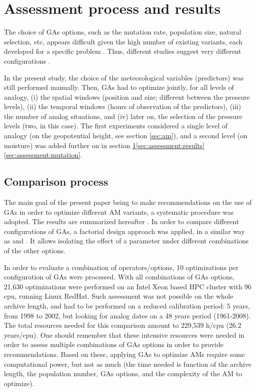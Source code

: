 \documentclass{ametsoc}
\begin{document}
\section{Assessment process and results}
\label{sec:assessment}

The choice of GAs options, such as the mutation rate, population size, natural selection, etc, appears difficult given the high number of existing variants, each developed for a specific problem \citep{Haupt2004, Costa2007a}. Thus, different studies suggest very different configurations \citep{DeJong1975a, Grefenstette1986, Back1996a, Back1996b}.

In the present study, the choice of the meteorological variables (predictors) was still performed manually. Then, GAs had to optimize jointly, for all levels of analogy, (i) the spatial windows (position and size; different between the pressure levels), (ii) the temporal windows (hours of observation of the predictors), (iii) the number of analog situations, and (iv) later on, the selection of the pressure levels (two, in this case). The first experiments considered a single level of analogy (on the geopotential height, see section \ref{sec:am}), and a second level (on moisture) was added further on in section \ref{sec:assessment}\ref{sec:assessment:results}\ref{sec:assessment:mutation}.


\subsection{Comparison process}

The main goal of the present paper being to make recommendations on the use of GAs in order to optimize different AM variants, a systematic procedure was adopted. The results are summarized hereafter \citep[see][for the details]{Horton2012a}. In order to compare different configurations of GAs, a factorial design approach was applied, in a similar way as \citet{Costa2005a,Costa2007a} and \citet{Mariano2010a}. It allows isolating the effect of a parameter under different combinations of the other options.

In order to evaluate a combination of operators/options, 10 optimizations per configuration of GAs were processed. With all combinations of GAs options, 21,630 optimizations were performed on an Intel Xeon based HPC cluster with 96 cpu, running Linux RedHat. Such assessment was not possible on the whole archive length, and had to be performed on a reduced calibration period: 5 years, from 1998 to 2002, but looking for analog dates on a 48 years period (1961-2008). The total resources needed for this comparison amount to 229,539 h/cpu (26.2 years/cpu). One should remember that these intensive resources were needed in order to assess multiple combinations of GAs options in order to provide recommendations. Based on these, applying GAs to optimize AMs require some computational power, but not as much (the time needed is function of the archive length, the population number, GAs options, and the complexity of the AM to optimize). 
\end{document}
